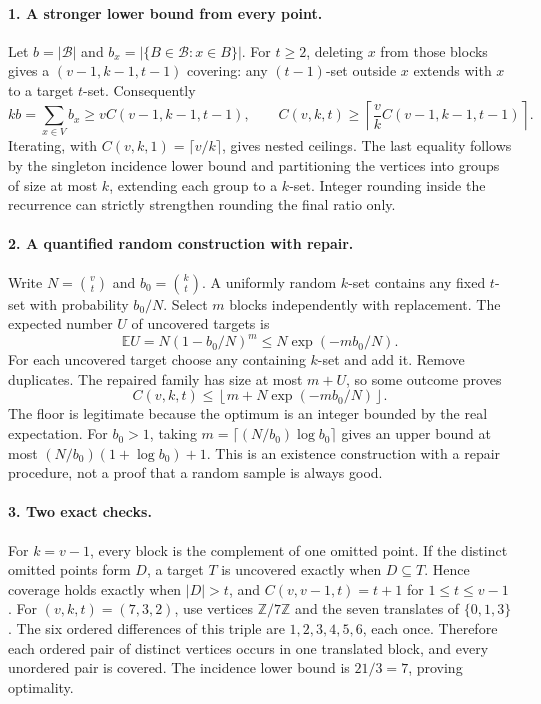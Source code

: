 \documentclass[11pt,a4paper]{article}
\begin{document}
\paragraph{1. A stronger lower bound from every point.}
Let $b=|\mathcal B|$ and $b_x=|\{B\in\mathcal B:x\in B\}|$.
For $t\ge2$, deleting $x$ from those blocks gives a
$(v-1,k-1,t-1)$ covering: any $(t-1)$-set outside $x$ extends with $x$
to a target $t$-set. Consequently
\[
 kb=\sum_{x\in V}b_x\ge v C(v-1,k-1,t-1),\qquad
 C(v,k,t)\ge\left\lceil\frac vk C(v-1,k-1,t-1)\right\rceil.
\]
Iterating, with $C(v,k,1)=\lceil v/k\rceil$, gives nested ceilings.
The last equality follows by the singleton incidence lower bound and
partitioning the vertices into groups of size at most $k$, extending
each group to a $k$-set. Integer rounding inside the recurrence can
strictly strengthen rounding the final ratio only.

\paragraph{2. A quantified random construction with repair.}
Write $N=\binom vt$ and $b_0=\binom kt$. A uniformly random $k$-set
contains any fixed $t$-set with probability $b_0/N$. Select $m$ blocks
independently with replacement. The expected number $U$ of uncovered
targets is
\[
 \mathbb E U=N(1-b_0/N)^m\le N\exp(-mb_0/N).
\]
For each uncovered target choose any containing $k$-set and add it.
Remove duplicates. The repaired family has size at most $m+U$, so
some outcome proves
\[
 C(v,k,t)\le\left\lfloor m+N\exp(-mb_0/N)\right\rfloor.
\]
The floor is legitimate because the optimum is an integer bounded by
the real expectation. For $b_0>1$, taking
$m=\lceil (N/b_0)\log b_0\rceil$ gives an upper bound at most
$(N/b_0)(1+\log b_0)+1$. This is an existence construction with a
repair procedure, not a proof that a random sample is always good.

\paragraph{3. Two exact checks.}
For $k=v-1$, every block is the complement of one omitted point. If
the distinct omitted points form $D$, a target $T$ is uncovered exactly
when $D\subseteq T$. Hence coverage holds exactly when $|D|>t$,
and $C(v,v-1,t)=t+1$ for $1\le t\le v-1$.
For $(v,k,t)=(7,3,2)$, use vertices $\mathbb Z/7\mathbb Z$ and
the seven translates of $\{0,1,3\}$. The six ordered differences of
this triple are $1,2,3,4,5,6$, each once. Therefore each ordered pair
of distinct vertices occurs in one translated block, and every unordered
pair is covered. The incidence lower bound is $21/3=7$, proving optimality.
\end{document}

